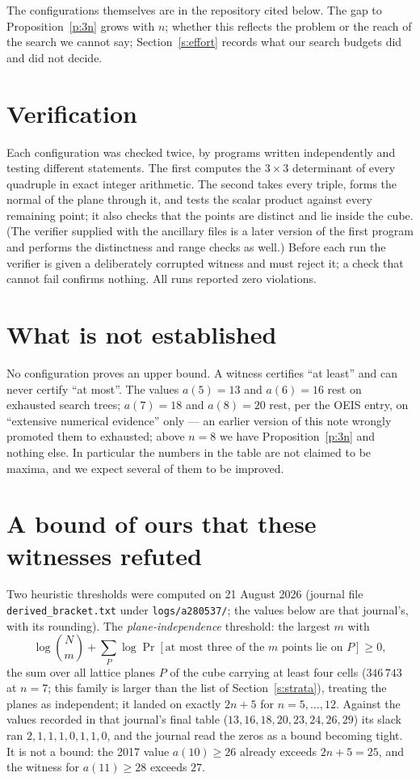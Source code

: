 \documentclass[11pt,a4paper]{article}
\begin{document}
The configurations themselves are in the repository cited below.  The gap to
Proposition~\ref{p:3n} grows with $n$; whether this reflects the problem or the reach of the
search we cannot say; Section~\ref{s:effort} records what our search budgets did and did not decide.

\section{Verification}
Each configuration was checked twice, by programs written independently and testing different
statements.  The first computes the $3\times3$ determinant of every quadruple in exact integer
arithmetic.  The second takes every triple, forms the normal of the plane through it, and tests
the scalar product against every remaining point; it also checks that the points are distinct
and lie inside the cube.  (The verifier supplied with the ancillary files is a later version of the
first program and performs the distinctness and range checks as well.)  Before each run the verifier is
given a deliberately corrupted witness and must reject it; a check that cannot fail confirms
nothing.  All runs reported zero violations.

\section{What is not established}\label{s:notest}
No configuration proves an upper bound.  A witness certifies ``at least'' and can never certify
``at most''.  The values $a(5)=13$ and $a(6)=16$ rest on exhausted search trees; $a(7)=18$ and
$a(8)=20$ rest, per the OEIS entry, on ``extensive numerical evidence'' only --- an earlier
version of this note wrongly promoted them to exhausted; above $n=8$ we have
Proposition~\ref{p:3n} and nothing else.  In particular the numbers
in the table are not claimed to be maxima, and we expect several of them to be improved.

\section{A bound of ours that these witnesses refuted}
Two heuristic thresholds were computed on 21 August 2026 (journal file \texttt{derived\_bracket.txt} under \texttt{logs/a280537/}; the
values below are that journal's, with its rounding).  The \emph{plane-independence} threshold: the largest $m$ with
\[\log\binom{N}{m}+\sum_P\log\Pr[\text{at most three of the $m$ points lie on }P]\ge0,\]
the sum over all lattice planes $P$ of the cube carrying at least four cells ($346\,743$ at $n=7$; this family is larger than the list of
Section~\ref{s:strata}), treating the planes as independent; it landed on exactly $2n+5$ for $n=5,\dots,12$.  Against the values recorded in that journal's final table
($13,16,18,20,23,24,26,29$) its slack ran $2,1,1,1,0,1,1,0$, and the journal read the zeros as a bound becoming
tight.  It is not a bound: the 2017 value $a(10)\ge26$ already exceeds $2n+5=25$, and the witness for
$a(11)\ge28$ exceeds $27$.
\end{document}
